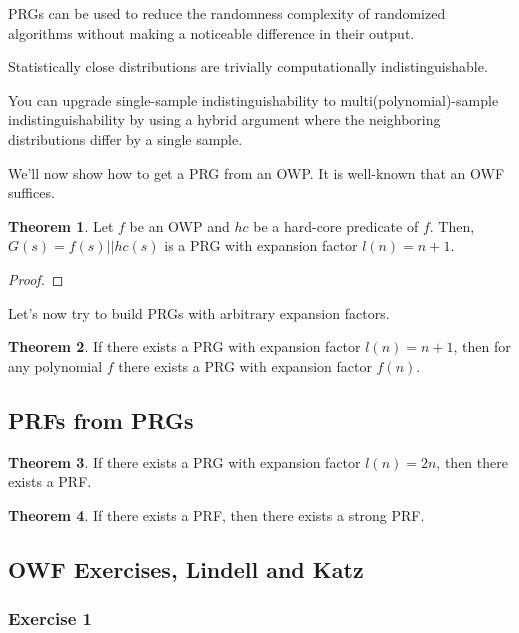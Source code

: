 \documentclass{article}
\theoremstyle{definition}
\newtheorem{theorem}{Theorem}[section]
\begin{document}
PRGs can be used to reduce the randomness complexity of randomized algorithms
without making a noticeable difference in their output.

Statistically close distributions are trivially computationally indistinguishable.

You can upgrade single-sample indistinguishability to multi(polynomial)-sample indistinguishability
by using a hybrid argument where the neighboring distributions differ by a single sample.



We'll now show how to get a PRG from an OWP. It is well-known that an OWF suffices.

\begin{theorem}
    Let $f$ be an OWP and $hc$ be a hard-core predicate of $f$. Then, $G(s) = f(s) || hc(s)$
    is a PRG with expansion factor $l(n) = n + 1$.
\end{theorem}
\begin{proof}
    
\end{proof}

Let's now try to build PRGs with arbitrary expansion factors.

\begin{theorem}
    If there exists a PRG with expansion factor $l(n) = n + 1$, then for any polynomial $f$
    there exists a PRG with expansion factor $f(n)$.
\end{theorem}

\subsection{PRFs from PRGs}

\begin{theorem}
    If there exists a PRG with expansion factor $l(n) = 2n$, then there exists a PRF.
\end{theorem}

\begin{theorem}
    If there exists a PRF, then there exists a strong PRF.
\end{theorem}

\subsection{OWF Exercises, Lindell and Katz}

\subsubsection{Exercise 1}
\end{document}
